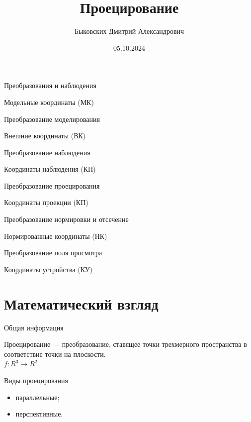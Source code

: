 \documentclass{beamer}
\title[Проецирование]{Проецирование}
\author[Быковских Д.А.]{Быковских Дмитрий Александрович}
\date{05.10.2024}
\begin{document}
	\begin{frame}
		\titlepage
	\end{frame}

	\begin{frame}{Преобразования и наблюдения}

		{\hfill
		Модельные координаты (МК)
		}
		
		Преобразование моделирования
		
		{\hfill
		Внешние координаты (ВК)
		}

		Преобразование наблюдения

		{\hfill
		Координаты наблюдения (КН)
		}

		Преобразование проецирования
		
		{\hfill
		Координаты проекции (КП)
		}
		
		Преобразование нормировки и отсечение
		
		{\hfill
		Нормированные координаты (НК)
		}

		Преобразование поля просмотра
		
		{\hfill
		Координаты устройства (КУ)
		}				
	\end{frame}

	\section{Математический взгляд}

	\begin{frame}{Общая информация}
		
		Проецирование --- преобразование, ставящее точки трехмерного пространства 
		в соответствие точки на плоскости. \\
		$f: R^3 \to R^2$
		
		Виды проецирования
		\begin{itemize}
			\item параллельные;
			\item перспективные.
		\end{itemize}

	\end{frame}
\end{document}
